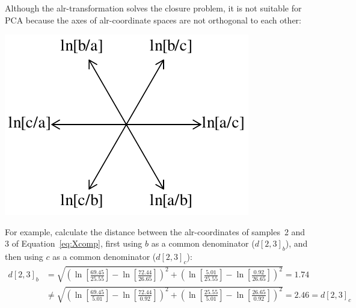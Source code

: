 Although the alr-transformation solves the closure problem, it is not
suitable for PCA because the axes of alr-coordinate spaces are not
orthogonal to each other:

\noindent\begin{minipage}[t][][b]{.3\textwidth}
\includegraphics[width=\textwidth]{../figures/alraxes.pdf}\medskip
\end{minipage}
\begin{minipage}[t][][t]{.7\textwidth}
  \label{fig:alraxes}
\end{minipage}

For example, calculate the distance between the alr-coordinates of
samples~2 and 3 of Equation~\ref{eq:Xcomp}, first using $b$ as a
common denominator ($d[2,3]_b$), and then using $c$ as a common
denominator ($d[2,3]_c$):
\begin{equation*}
  \begin{split}
    d[2,3]_b & =
    \sqrt{
      \left(
      \ln\!\left[\frac{69.45}{25.55}\right]-
      \ln\!\left[\frac{72.44}{26.65}\right]
      \right)^2 +
      \left(
      \ln\!\left[\frac{5.01}{25.55}\right]-
      \ln\!\left[\frac{0.92}{26.65}\right]
      \right)^2
    } = 1.74\\
    & \neq 
    \sqrt{
      \left(
      \ln\!\left[\frac{69.45}{5.01}\right]-
      \ln\!\left[\frac{72.44}{0.92}\right]
      \right)^2 +
      \left(
      \ln\!\left[\frac{25.55}{5.01}\right]-
      \ln\!\left[\frac{26.65}{0.92}\right]
      \right)^2
    } = 2.46 = d[2,3]_c
  \end{split}
\end{equation*}


